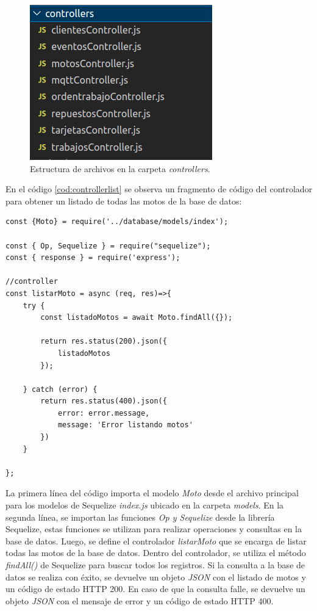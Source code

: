 \begin{figure}[ht]
	\centering
	\includegraphics[scale=.50]{./Figures/api-controllers.png}
	\caption{Estructura de archivos en la carpeta \textit{controllers}.}
	\label{fig:apicontrollers}
	
\end{figure}

En el código \ref{cod:controllerlist} se observa un fragmento de código del controlador para obtener un listado de todas las motos de la base de datos:

\begin{lstlisting}[label=cod:controllerlist,caption=Código de controlador para obtener listado de motos.]
const {Moto} = require('../database/models/index');

const { Op, Sequelize } = require("sequelize");
const { response } = require('express');

//controller
const listarMoto = async (req, res)=>{
    try {
        const listadoMotos = await Moto.findAll({});
        
        return res.status(200).json({
            listadoMotos
        }); 

    } catch (error) {
        return res.status(400).json({
            error: error.message,
            message: 'Error listando motos'
        })
    }
    
};
\end{lstlisting}

La primera línea del código importa el modelo \textit{Moto} desde el archivo principal para los modelos de Sequelize \textit{index.js} ubicado en la carpeta \textit{models}. En la segunda línea, se importan las funciones \textit{Op y Sequelize} desde la librería Sequelize, estas funciones se utilizan para realizar operaciones y consultas en la base de datos. Luego, se define el controlador \textit{listarMoto} que se encarga de listar todas las motos de la base de datos. Dentro del controlador, se utiliza el método \textit{findAll()} de Sequelize para buscar todos los registros. Si la consulta a la base de datos se realiza con éxito, se devuelve un objeto \textit{JSON} con el listado de motos y un código de estado HTTP 200. En caso de que la consulta falle, se devuelve un objeto \textit{JSON} con el mensaje de error y un código de estado HTTP 400.

